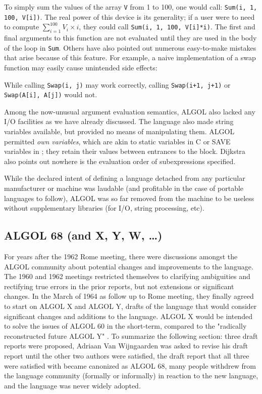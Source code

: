To simply sum the values of the array \texttt{V} from 1 to 100, one would call:
\texttt{Sum(i, 1, 100, V[i])}.
The real power of this device is its generality;
if a user were to need to compute $\sum_{i=1}^{100} V_{i}\times i$,
they could call \texttt{Sum(i, 1, 100, V[i]*i)}.
The first and final arguments to this function are not evaluated
until they are used in the body of the loop in \texttt{Sum}.
Others have also pointed out numerous easy-to-make mistakes
that arise because of this feature.
For example, a naive implementation of a swap function may easily
cause unintended side effects:



While calling \texttt{Swap(i, j)} may work correctly, calling
\texttt{Swap(i+1, j+1)} or \texttt{Swap(A[i], A[j])} would not.

Among the now-unusual argument evaluation semantics, ALGOL also lacked any I/O
facilities as we have already discussed.  The language also made string
variables available, but provided no means of manipulating them.  ALGOL
permitted \textit{own variables}, which are akin to static variables in C or
SAVE variables in \FTN{}; they retain their values between entrances to the
block.  Dijkstra also points out nowhere is the evaluation order of
subexpressions specified\cite{dijkstra_defense_of_algol_60_1961}.

While the declared intent of defining a language detached from any particular
manufacturer or machine was laudable (and profitable in the case of portable
languages to follow), ALGOL was so far removed from the machine to be useless without
supplementary libraries (for I/O, string processing, etc).

\subsection{ALGOL 68 (and X, Y, W, \dots)}

For years after the 1962 Rome meeting, there were discussions amongst the ALGOL
community about potential changes and improvements to the language.
The 1960 and 1962 meetings restricted themselves to clarifying ambiguities
and rectifying true errors in the prior reports, but not extensions or
significant changes.
In the March of 1964 as follow up to Rome meeting, they finally agreed to
start on ALGOL X and ALGOL Y, drafts of the language that would consider
significant changes and additions to the language.
ALGOL X would be intended to solve the issues of ALGOL 60 in the short-term,
compared to the "radically reconstructed future ALGOL Y"
\cite{cleaning_up_algol60_duncan_wijngaarden_1964}.
To summarize the following section: three draft reports were proposed,
Adriaan Van Wijngaarden was asked to revise his draft report until the other
two authors were satisfied,
the draft report that all three were satisfied with became canonized as ALGOL 68,
many people withdrew from the language community (formally or informally)
in reaction to the new language,
and the language was never widely adopted.


